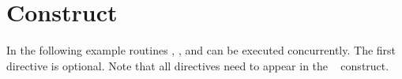 \pagebreak
\section{  Construct}
\label{sec:psections}

In the following example routines , , and  can 
be executed concurrently. The first  directive is optional. Note 
that all  directives need to appear in the 
~ construct.



